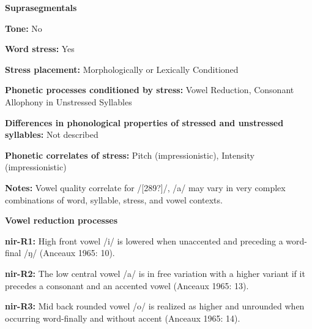 \begin{styleBody}
\textbf{Suprasegmentals}
\end{styleBody}

\begin{styleBody}
\textbf{Tone:} No
\end{styleBody}

\begin{styleBody}
\textbf{Word stress:} Yes
\end{styleBody}

\begin{styleBody}
\textbf{Stress placement:} Morphologically or Lexically Conditioned
\end{styleBody}

\begin{styleBody}
\textbf{Phonetic processes conditioned by stress:} Vowel Reduction, Consonant Allophony in Unstressed Syllables
\end{styleBody}

\begin{styleBody}
\textbf{Differences in phonological properties of stressed and unstressed syllables:} Not described
\end{styleBody}

\begin{styleBody}
\textbf{Phonetic correlates of stress: }Pitch (impressionistic), Intensity (impressionistic)
\end{styleBody}

\begin{styleBody}
\textbf{Notes: }Vowel quality correlate for /[289?]/, /a/ may vary in very complex combinations of word, syllable, stress, and vowel contexts.
\end{styleBody}

\begin{styleBody}
\textbf{Vowel reduction processes}
\end{styleBody}

\begin{styleBody}
\textbf{nir-R1:} High front vowel /i/ is lowered when unaccented and preceding a word-final /ŋ/ (Anceaux 1965: 10).
\end{styleBody}

\begin{styleBody}
\textbf{nir-R2:} The low central vowel /a/ is in free variation with a higher variant if it precedes a consonant and an accented vowel (Anceaux 1965: 13).
\end{styleBody}

\begin{styleBody}
\textbf{nir-R3: }Mid back rounded vowel /o/ is realized as higher and unrounded when occurring word-finally and without accent (Anceaux 1965: 14).
\end{styleBody}


